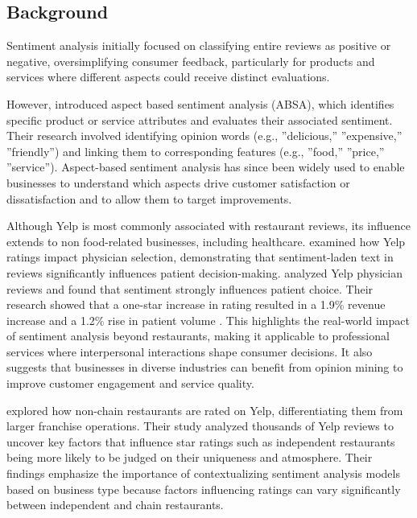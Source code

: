 \documentclass{article}
\begin{document}
\subsection{Background}

Sentiment analysis initially focused on classifying entire reviews as positive or negative, oversimplifying consumer feedback, particularly for products and services where different aspects could receive distinct evaluations.

However, \cite{HuLiu2004} introduced aspect based sentiment analysis (ABSA), which identifies specific product or service attributes and evaluates their associated sentiment. Their research involved identifying opinion words (e.g., ”delicious,” ”expensive,” ”friendly”) and linking them to corresponding features (e.g., ”food,” ”price,” ”service”). Aspect-based sentiment analysis has since been widely used to enable businesses to understand which aspects drive customer satisfaction or dissatisfaction and to allow them to target improvements.

Although Yelp is most commonly associated with restaurant reviews, its influence extends to non food-related businesses, including healthcare. \cite{ChenLee2024} examined how Yelp ratings impact physician selection, demonstrating that sentiment-laden text in reviews significantly influences patient decision-making. \cite{ChenLee2024} analyzed Yelp physician reviews and found that sentiment strongly influences patient choice. Their research showed that a one-star increase in rating resulted in a 1.9\% revenue increase and a 1.2\% rise in patient volume \citep{ChenLee2024}. This highlights the real-world impact of sentiment analysis beyond restaurants, making it applicable to professional services where interpersonal interactions shape consumer decisions. It also suggests that businesses in diverse industries can benefit from opinion mining to improve customer engagement and service quality.

\cite{KellerKostromitina2020} explored how non-chain restaurants are rated on Yelp, differentiating them from larger franchise operations. Their study analyzed thousands of Yelp reviews to uncover key factors that influence star ratings such as independent restaurants being more likely to be judged on their uniqueness and atmosphere. Their findings emphasize the importance of contextualizing sentiment analysis models based on business type because factors influencing ratings can vary significantly between independent and chain restaurants. 
\end{document}
